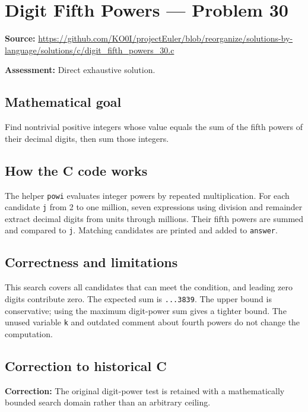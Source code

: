 \section{Digit Fifth Powers --- Problem 30}
\label{prob:30}
\noindent\textbf{Source:} \url{https://github.com/KO0I/projectEuler/blob/reorganize/solutions-by-language/solutions/c/digit_fifth_powers_30.c}

\noindent\textbf{Assessment:} Direct exhaustive solution.

\subsection*{Mathematical goal}
Find nontrivial positive integers whose value equals the sum of the fifth powers of their decimal digits, then sum those integers.

\subsection*{How the C code works}
The helper \verb|powi| evaluates integer powers by repeated multiplication. For each candidate \verb|j| from 2 to one million, seven expressions using division and remainder extract decimal digits from units through millions. Their fifth powers are summed and compared to \verb|j|. Matching candidates are printed and added to \verb|answer|.

\subsection*{Correctness and limitations}
This search covers all candidates that can meet the condition, and leading zero digits contribute zero. The expected sum is \texttt{...3839}. The upper bound is conservative; using the maximum digit-power sum gives a tighter bound. The unused variable \verb|k| and outdated comment about fourth powers do not change the computation.


\subsection*{Correction to historical C}
{\color{red}\textbf{Correction:} The original digit-power test is retained with a mathematically bounded search domain rather than an arbitrary ceiling.}
